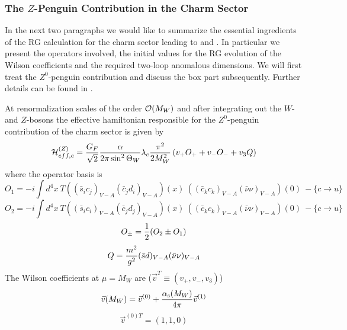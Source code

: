 \subsubsection{The $Z$-Penguin Contribution in the Charm Sector}
               \label{sec:HeffRareKB:kpnn:Zpcharm}
In the next two paragraphs we would like to summarize the essential
ingredients of the RG calculation for the charm sector leading to
 and . In particular we present the operators involved,
the initial values for the RG evolution of the Wilson coefficients and
the required two-loop anomalous dimensions. We will first treat
the $Z^0$-penguin contribution  and discuss the box part 
subsequently. Further details can be found in \cite{buchallaburas:94}.

At renormalization scales of the order ${\cal O}(M_W)$ and after
integrating out the $W$- and $Z$-bosons the effective hamiltonian
responsible for the $Z^0$-penguin contribution of the charm sector is given
by
\begin{equation}\label{hzop}{\cal H}^{(Z)}_{eff,c}={G_F \over{\sqrt 2}}
{\alpha\over 2\pi \sin^2\Theta_W}\lambda_c{\pi^2\over 2 M^2_W}
\left( v_+ O_+ +v_- O_- +v_3 Q\right) \end{equation}
where the operator basis is
\begin{equation}\label{o1} O_1=
   -i\int d^4x\ T\left((\bar s_ic_j)_{V-A}(\bar c_jd_i)_{V-A}\right)(x)\
       \left((\bar c_kc_k)_{V-A}(\bar\nu\nu)_{V-A}\right)(0)\ -
       \{c\to u\}    \end{equation}
\begin{equation}\label{o2} O_2=
   -i\int d^4x\ T\left((\bar s_ic_i)_{V-A}(\bar c_jd_j)_{V-A}\right)(x)\
       \left((\bar c_kc_k)_{V-A}(\bar\nu\nu)_{V-A}\right)(0)\ -
       \{c\to u\}    \end{equation}
\begin{equation}\label{opm} O_\pm ={1\over 2}(O_2 \pm O_1) \end{equation}
\begin{equation}\label{qnu} Q={m^2\over g^2} (\bar sd)_{V-A}(\bar\nu\nu)_{V-A}   \end{equation}
The Wilson coefficients at $\mu=M_W$ are
($\vec v^T\equiv(v_+,v_-,v_3)$)
\begin{equation}\label{vmw} \vec v(M_W)=\vec v^{(0)}+\frac{\alpha_{\rm s}(M_W)}{4 \pi}
\vec v^{(1)}
\end{equation}
\begin{equation}\label{v0} {\vec v^{(0)T}}=(1,1,0)  \end{equation}
